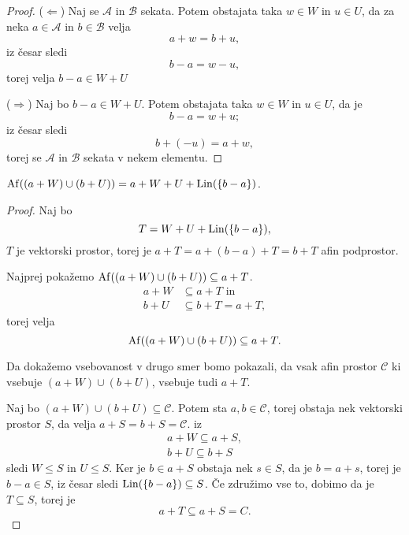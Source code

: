 \begin{proof}
    ($\Leftarrow$)
    Naj se $\mathcal{A}$ in $\mathcal{B}$ sekata. Potem obstajata taka $w \in W$ in $u \in U$, da za neka $a \in \mathcal{A}$ in $b \in \mathcal{B}$ velja
    \[
    a + w = b + u,    
    \]
    iz česar sledi
    \[
    b - a = w - u,    
    \]
    torej velja $b - a \in W + U$

    ($\Rightarrow$)
    Naj bo $b - a \in W + U$. Potem obstajata taka $w \in W$ in $u \in U$, da je
    \[
    b - a = w + u;    
    \]
    iz česar sledi
    \[
    b + (- u) = a + w,    
    \]
    torej se $\mathcal{A}$ in $\mathcal{B}$ sekata v nekem elementu.
\end{proof}

\begin{lema}
    $\operatorname{Af} ((a + W) \cup (b + U)) = a + W + U + \operatorname{Lin} (\left\{b - a\right\})$.
\end{lema}

\begin{proof}
    Naj bo 
    \[
    T = W + U + \operatorname{Lin} (\left\{b - a\right\}),
    \]
    $T$ je vektorski prostor, torej je $a + T = a + (b - a) + T = b + T$ afin podprostor.

    Najprej pokažemo $\operatorname{Af} ((a + W) \cup (b + U)) \subseteq a + T$.
    \begin{align*}
        a + W &\subseteq a + T \text{ in} \\
        b + U &\subseteq b + T = a + T,
    \end{align*}
    torej velja
    \[
    \operatorname{Af} ((a + W) \cup (b + U)) \subseteq a + T.
    \]

    Da dokažemo vsebovanost v drugo smer bomo pokazali, da vsak afin prostor $\mathcal{C}$ ki vsebuje $(a + W) \cup (b + U)$, vsebuje tudi $a + T$.

    Naj bo $(a + W) \cup (b + U) \subseteq \mathcal{C}$. Potem sta $a, b \in \mathcal{C}$, torej obstaja nek vektorski prostor $S$, da velja $a + S = b + S = \mathcal{C}$. iz
    \begin{align*}
        a + W \subseteq a + S, \\
        b + U \subseteq b + S
    \end{align*}
    sledi $W \leq S$ in $U \leq S$. Ker je $b \in a + S$ obstaja nek $s \in S$, da je $b = a + s$, torej je $b - a \in S$, iz česar sledi $\operatorname{Lin} (\left\{b - a\right\}) \subseteq S$.
    Če združimo vse to, dobimo da je $T \subseteq S$, torej je
    \[
    a + T \subseteq a + S = C.
    \] 
\end{proof}

